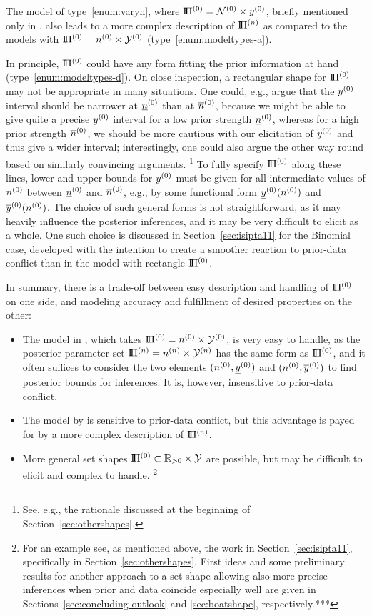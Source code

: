 The model of type~\eqref{enum:varyn}, where $\text{I}\!\Pi^{(0)} = \mathcal{N}^{(0)} \times y^{(0)}$,
briefly mentioned only in \textcite[footnote no.~10 in \S 1.1.4, and \S 7.8.3]{1991:walley},
also leads to a more complex description of $\text{I}\!\Pi^{(n)}$ as compared to the models with $\text{I}\!\Pi^{(0)} = n^{(0)} \times \mathcal{Y}^{(0)}$ (type~\eqref{enum:modeltypes-a}).

In principle, $\text{I}\!\Pi^{(0)}$ could have any form fitting the prior information at hand (type~\eqref{enum:modeltypes-d}).
On close inspection, a rectangular shape for $\text{I}\!\Pi^{(0)}$ may not be appropriate in many situations.
One could, e.g., argue that the $y^{(0)}$ interval should be narrower at $\underline{n}^{(0)}$ than at $\overline{n}^{(0)}$,
because we might be able to give quite a precise $y^{(0)}$ interval for a low prior strength $\underline{n}^{(0)}$,
whereas for a high prior strength $\overline{n}^{(0)}$, we should be more cautious with our elicitation of $y^{(0)}$ and thus give a wider interval;
interestingly, one could also argue the other way round based on similarly convincing arguments.%
\footnote{See, e.g., the rationale discussed at the beginning of Section~\ref{sec:othershapes}.}
To fully specify $\text{I}\!\Pi^{(0)}$ along these lines,
lower and upper bounds for $y^{(0)}$ must be given for all intermediate values of $n^{(0)}$ between $\underline{n}^{(0)}$ and $\overline{n}^{(0)}$,
e.g., by some functional form $\underline{y}^{(0)}(n^{(0)})$ and $\overline{y}^{(0)}(n^{(0)})$.
The choice of such general forms is not straightforward,
as it may heavily influence the posterior inferences,
and it may be very difficult to elicit as a whole.
One such choice is discussed in Section~\ref{sec:isipta11} \parencite{Walter2011a} for the Binomial case,
developed with the intention to create a smoother reaction to prior-data conflict than in the model with rectangle $\text{I}\!\Pi^{(0)}$.

In summary, there is a trade-off between easy description and handling of $\text{I}\!\Pi^{(0)}$ on one side,
and modeling accuracy and fulfillment of desired properties on the other:
\begin{itemize}%
\item The model in \textcite{2005:quaeghebeurcooman}, which takes $\text{I}\!\Pi^{(0)} = n^{(0)} \times \mathcal{Y}^{(0)}$, is very easy to handle,
as the posterior parameter set $\text{I}\!\Pi^{(n)} = n^{(n)} \times \mathcal{Y}^{(n)}$ has the same form as $\text{I}\!\Pi^{(0)}$,
and it often suffices to consider the two elements $(n^{(0)}, \underline{y}^{(0)})$ and $(n^{(0)}, \overline{y}^{(0)})$ to find posterior bounds for inferences.
It is, however, insensitive to prior-data conflict.
\item The model by \textcite{Walter2009a} is sensitive to prior-data conflict,
but this advantage is payed for by a more complex description of $\text{I}\!\Pi^{(n)}$.
\item More general set shapes $\text{I}\!\Pi^{(0)} \subset \mathbb{R}_{>0} \times \mathcal{Y}$ are possible,
but may be difficult to elicit and complex to handle.%
\footnote{For an example see, as mentioned above, the work in Section~\ref{sec:isipta11}, specifically in Section~\ref{sec:othershapes}.
First ideas and some preliminary results for another approach to a set shape allowing
also more precise inferences when prior and data coincide especially well
are given in Sections~\ref{sec:concluding-outlook} and \ref{sec:boatshape}, respectively.***}
\end{itemize}

